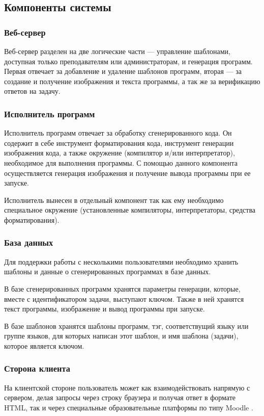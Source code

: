 \subsection{Компоненты системы}

\subsubsection{Веб-сервер}
Веб-сервер разделен на две логические части ---
управление шаблонами, доступная только преподавателям
или администраторам, и генерация программ. Первая отвечает
за добавление и удаление шаблонов программ, вторая --- за создание и получение изображения
и текста программы, а так же за верификацию ответов на задачу.

\subsubsection{Исполнитель программ} \label{executor}
Исполнитель программ отвечает за обработку сгенерированного
кода. Он содержит в себе инструмент форматирования кода, инструмент генерации изображения
кода, а также окружение (компилятор и/или интерпретатор), необходимое для выполнения
программы. С помощью данного компонента осуществляется генерация изображения и получение
вывода программы при ее запуске.

Исполнитель вынесен в отдельный компонент так как ему необходимо специальное окружение
(установленные компиляторы, интерпретаторы, средства форматирования).

\subsubsection{База данных}
\label{db-model}
Для поддержки работы с несколькими пользователями необходимо хранить шаблоны и данные о
сгенерированных программах в базе данных.

В базе сгенерированных программ хранятся параметры генерации,
которые, вместе с
идентификатором задачи, выступают ключом. Также в ней хранятся текст программы,
изображение и вывод программы при запуске.

\label{template-db} В базе шаблонов хранятся шаблоны программ, тэг, соответствущий языку или группе
языков, для которых написан этот шаблон, и имя шаблона (задачи), которое является ключом.

\subsubsection{Сторона клиента}
На клиентской стороне пользователь может как взаимодействовать напрямую с сервером,
делая запросы через строку браузера и получая ответ в формате HTML, так и через
специальные образовательные платформы по типу Moodle \cite*{moodle}.


